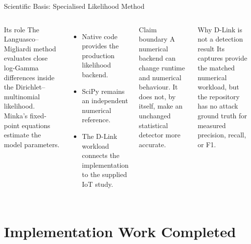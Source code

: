 \documentclass[aspectratio=169,10pt]{beamer}
\begin{document}
\begin{frame}{Scientific Basis: Specialised Likelihood Method}
\begin{columns}[T,onlytextwidth]
\begin{block}{Its role}
The Languasco--Migliardi method evaluates close log-Gamma differences inside
the Dirichlet--multinomial likelihood. Minka's fixed-point equations estimate
the model parameters.
\end{block}

\begin{itemize}
  \item Native code provides the production likelihood backend.
  \item SciPy remains an independent numerical reference.
  \item The D-Link workload connects the implementation to the supplied IoT
  study.
\end{itemize}

\begin{alertblock}{Claim boundary}
A numerical backend can change runtime and numerical behaviour. It does not,
by itself, make an unchanged statistical detector more accurate.
\end{alertblock}

\begin{exampleblock}{Why D-Link is not a detection result}
Its captures provide the matched numerical workload, but the repository has no
attack ground truth for measured precision, recall, or F1.
\end{exampleblock}
\end{columns}
\end{frame}

\section{Implementation Work Completed}
\end{document}
